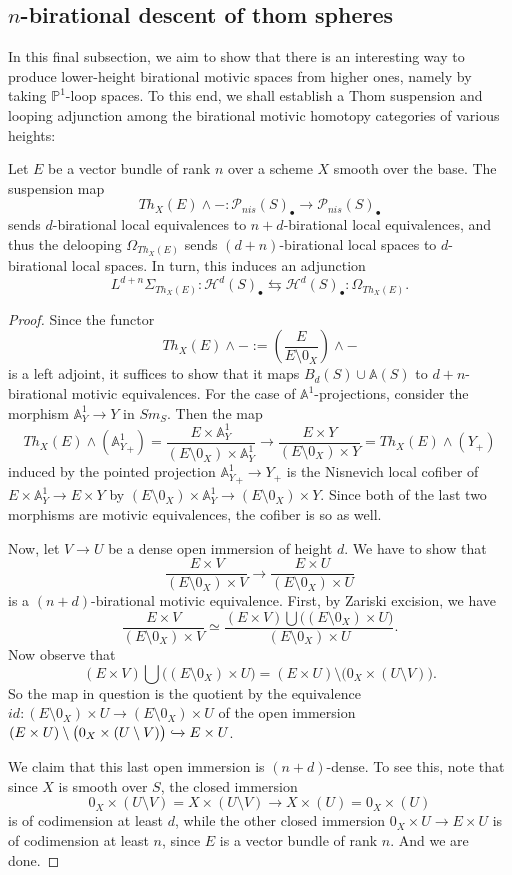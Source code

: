 \subsection{$n$-birational descent of thom spheres}\label{4.5}
In this final subsection, we aim to show that there is an interesting way to produce lower-height birational motivic spaces from higher ones, namely by taking $\mathbb{P}^1$-loop spaces. To this end, we shall establish a Thom suspension and looping adjunction among the birational motivic homotopy categories of various heights:
\begin{prop}
   Let $E$ be a vector bundle of rank $n$ over a scheme $X$ smooth over the base. The suspension map $$Th_X(E)\wedge -: \mathcal{P}_{nis}(S)_\bullet\to \mathcal{P}_{nis}(S)_\bullet$$ sends $d$-birational local equivalences to $n+d$-birational local equivalences, and thus the delooping $\Omega _{Th_X(E)}$ sends $(d+n)$-birational local spaces to $d$-birational local spaces. In turn, this induces an adjunction $$L^{d+n}\Sigma _{Th_X(E)}: \mathcal{H}^{d}(S)_\bullet\leftrightarrows \mathcal{H}^{{d}}(S)_\bullet: \Omega _{Th_X(E)}.$$
\end{prop}
\begin{proof}
    Since the functor $$Th_X(E)\wedge -:=(\frac{E}{E\setminus0_X})\wedge -$$ is a left adjoint, it suffices to show that it maps $B_d(S)\cup \mathbb{A}(S)$ to $d+n$-birational motivic equivalences. For the case of $\mathbb{A}^1$-projections, consider the morphism $\mathbb{A}^1_Y\to Y$ in $Sm_S$. Then the map $$Th_X(E)\wedge ({\mathbb{A}^1_{{Y}}}_+)=\frac{E\times \mathbb{A}^1_Y}{(E\setminus0_X)\times \mathbb{A}^1_Y}\longrightarrow\frac{E\times Y}{(E\setminus0_X)\times Y}= Th_X(E)\wedge ({{Y_+}})$$
induced by the pointed projection ${\mathbb{A}^1_Y}_+\to Y_+$ is the Nisnevich local cofiber of 
    $E\times \mathbb{A}^1_Y\to E\times Y$ by $(E\setminus0_X)\times \mathbb{A}^1_Y\to (E\setminus0_X)\times Y$. Since both of the last two morphisms are motivic equivalences, the cofiber is so as well.
    
    Now, let $V\to U $ be a dense open immersion of height $d$. We have to show that $$\frac{E\times V}{(E\setminus0_X)\times V}\to \frac{E\times U}{(E\setminus0_X)\times U}$$ is a $(n+d)$-birational motivic equivalence. First, by Zariski excision, we have $$\frac{E\times V}{(E\setminus0_X)\times V}\simeq \frac{(E\times V ) \bigcup \big ((E\setminus0_X)\times U\big)  }{(E\setminus0_X)\times U}.$$ Now observe that $${(E\times V ) \bigcup \big ((E\setminus0_X)\times U\big)  }=(E\times U)\setminus\big (0_X\times (U\setminus V)\big).$$ So the map in question is the quotient by the
    equivalence $id:{(E\setminus0_X)\times U}\to {(E\setminus0_X)\times U}$ of the open immersion  $(E\times U)\setminus\big (0_X\times (U\setminus V)\big)\xhookrightarrow{} E\times U$.

    We claim that this last open immersion is $(n+d)$-dense. To see this, note that since $X$ is smooth over $S$, the closed immersion $$0_X\times (U\setminus V)=X\times (U\setminus V)\to X\times (U)=0_X\times (U)$$ is of codimension at least $d$, while the other closed immersion $0_X\times U\to E\times U$ is of codimension at least $n$, since $E$ is a vector bundle of rank $n$. And we are done. 
\end{proof}

